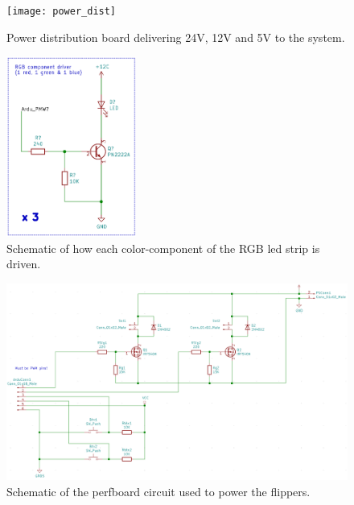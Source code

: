 \begin{figure}[h]
	\centering
	\texttt{[image: power\_dist]}
	\caption{Power distribution board delivering 24V, 12V and 5V to the system.}
	\label{fig:powboard}
\end{figure}

\begin{figure}[h]
	\centering
	\includegraphics[width=0.38\textwidth]{circuits/rgbled}
	\caption{Schematic of how each color-component of the RGB led strip is driven.}
	\label{cir:rgbled}
\end{figure}

\begin{figure}[h]
	\centering
	\includegraphics[width=\textwidth]{circuits/flipper}
	\caption{Schematic of the perfboard circuit used to power the flippers.}
	\label{cir:flipper}
\end{figure}

